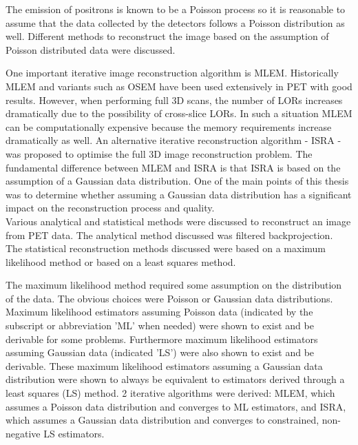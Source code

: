 \documentclass[report,12pt]{report}
\begin{document}
The emission of positrons is known to be a Poisson process so it is reasonable to assume that the data collected by the detectors follows a Poisson distribution as well. Different methods to reconstruct the image based on the assumption of Poisson distributed data were discussed.

One important iterative image reconstruction algorithm is MLEM. Historically MLEM and variants such as OSEM have been used extensively in PET with good results. However, when performing full 3D scans, the number of LORs increases dramatically due to the possibility of cross-slice LORs. In such a situation MLEM can be computationally expensive because the memory requirements increase dramatically as well. An alternative iterative reconstruction algorithm - ISRA - was proposed to optimise the full 3D image reconstruction problem. The fundamental difference between MLEM and ISRA is that ISRA is based on the assumption of a Gaussian data distribution. One of the main points of this thesis was to determine whether assuming a Gaussian data distribution has a significant impact on the reconstruction process and quality.\\

Various analytical and statistical methods were discussed to reconstruct an image from PET data. The analytical method discussed was filtered backprojection. The statistical reconstruction methods discussed were based on a maximum likelihood method or based on a least squares method. 

The maximum likelihood method required some assumption on the distribution of the data. The obvious choices were Poisson or Gaussian data distributions. Maximum likelihood estimators assuming Poisson data (indicated by the subscript or abbreviation 'ML' when needed) were shown to exist and be derivable for some problems. Furthermore maximum likelihood estimators assuming Gaussian data (indicated 'LS') were also shown to exist and be derivable. These maximum likelihood estimators assuming a Gaussian data distribution were shown to always be equivalent to estimators derived through a least squares (LS) method. 2 iterative  algorithms were derived: MLEM, which assumes a Poisson data distribution and converges to ML estimators, and ISRA, which assumes a Gaussian data distribution and converges to constrained, non-negative LS estimators.\\
\end{document}
